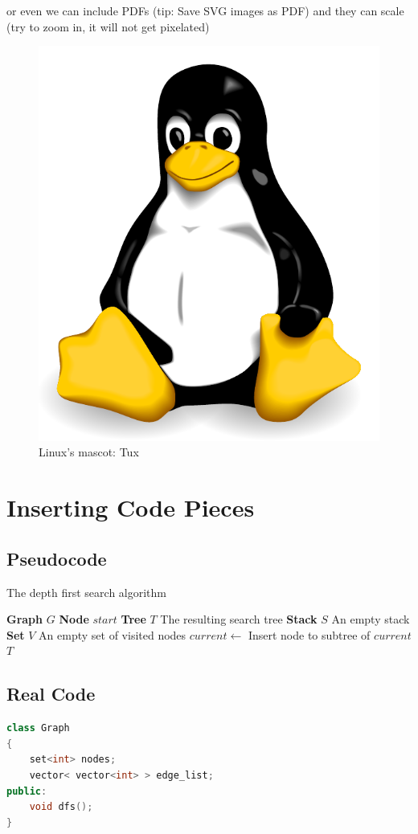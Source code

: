 \documentclass[a4paper, 12pt, titlepage]{article}
\begin{document}
or even we can include PDFs (tip: Save SVG images as PDF) and they can scale (try to zoom in, it will not get pixelated)

\begin{figure}[H]
	\centering
	\caption{Linux's mascot: Tux}
	\label{fig:tux}
	\includegraphics[width=.30\textwidth]{tux.pdf} %
\end{figure}

\newpage

\section{Inserting Code Pieces}
\subsection{Pseudocode}
\begin{algorithm}[H]
	\caption{The depth first search algorithm}
	\label{algo:dfs}
	\begin{algorithmic}
	\State \textbf{Graph} $G$
	\State \textbf{Node} $start$
		\State \textbf{Tree} $ T $ \Comment The resulting search tree
		\State \textbf{Stack} $ S $ \Comment An empty stack
		\State \textbf{Set} $ V $ \Comment An empty set of visited nodes
		\State {}
		\State {}
			\State $current \gets$ 
				\State {}
					\State {}
					\State {}
					\Comment Insert node to subtree of $ current $
				\EndFor
			\EndIf
		\EndWhile
		\State \Return $ T $
	\EndFunction
	\end{algorithmic}
\end{algorithm}

\subsection{Real Code}

\begin{lstlisting}[language=C++,caption=Depth first search in C++]
class Graph
{
	set<int> nodes;
	vector< vector<int> > edge_list;
public:
	void dfs();
}

\end{lstlisting}
\end{document}

